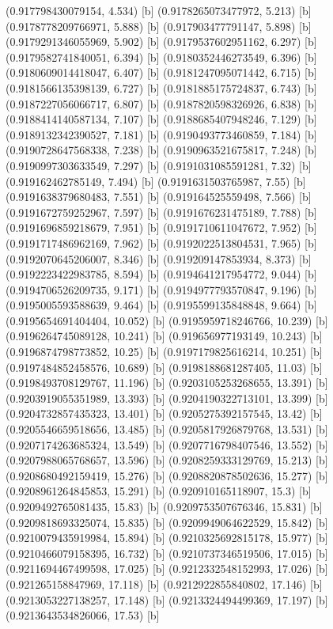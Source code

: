 {{{(0.917798430079154, 4.534) [b] 
(0.9178265073477972, 5.213) [b] 
(0.9178778209766971, 5.888) [b] 
(0.917903477791147, 5.898) [b] 
(0.9179291346055969, 5.902) [b] 
(0.9179537602951162, 6.297) [b] 
(0.9179582741840051, 6.394) [b] 
(0.9180352446273549, 6.396) [b] 
(0.9180609014418047, 6.407) [b] 
(0.9181247095071442, 6.715) [b] 
(0.9181566135398139, 6.727) [b] 
(0.9181885175724837, 6.743) [b] 
(0.9187227056066717, 6.807) [b] 
(0.9187820598326926, 6.838) [b] 
(0.9188414140587134, 7.107) [b] 
(0.9188685407948246, 7.129) [b] 
(0.9189132342390527, 7.181) [b] 
(0.9190493773460859, 7.184) [b] 
(0.9190728647568338, 7.238) [b] 
(0.9190963521675817, 7.248) [b] 
(0.9190997303633549, 7.297) [b] 
(0.9191031085591281, 7.32) [b] 
(0.919162462785149, 7.494) [b] 
(0.9191631503765987, 7.55) [b] 
(0.9191638379680483, 7.551) [b] 
(0.919164525559498, 7.566) [b] 
(0.9191672759252967, 7.597) [b] 
(0.9191676231475189, 7.788) [b] 
(0.9191696859218679, 7.951) [b] 
(0.9191710611047672, 7.952) [b] 
(0.9191717486962169, 7.962) [b] 
(0.9192022513804531, 7.965) [b] 
(0.9192070645206007, 8.346) [b] 
(0.919209147853934, 8.373) [b] 
(0.9192223422983785, 8.594) [b] 
(0.9194641217954772, 9.044) [b] 
(0.9194706526209735, 9.171) [b] 
(0.9194977793570847, 9.196) [b] 
(0.9195005593588639, 9.464) [b] 
(0.9195599135848848, 9.664) [b] 
(0.9195654691404404, 10.052) [b] 
(0.9195959718246766, 10.239) [b] 
(0.9196264745089128, 10.241) [b] 
(0.919656977193149, 10.243) [b] 
(0.9196874798773852, 10.25) [b] 
(0.9197179825616214, 10.251) [b] 
(0.9197484852458576, 10.689) [b] 
(0.9198188681287405, 11.03) [b] 
(0.9198493708129767, 11.196) [b] 
(0.9203105253268655, 13.391) [b] 
(0.9203919055351989, 13.393) [b] 
(0.9204190322713101, 13.399) [b] 
(0.9204732857435323, 13.401) [b] 
(0.9205275392157545, 13.42) [b] 
(0.9205546659518656, 13.485) [b] 
(0.9205817926879768, 13.531) [b] 
(0.9207174263685324, 13.549) [b] 
(0.9207716798407546, 13.552) [b] 
(0.9207988065768657, 13.596) [b] 
(0.9208259333129769, 15.213) [b] 
(0.9208680492159419, 15.276) [b] 
(0.9208820878502636, 15.277) [b] 
(0.9208961264845853, 15.291) [b] 
(0.920910165118907, 15.3) [b] 
(0.9209492765081435, 15.83) [b] 
(0.9209753507676346, 15.831) [b] 
(0.9209818693325074, 15.835) [b] 
(0.9209949064622529, 15.842) [b] 
(0.9210079435919984, 15.894) [b] 
(0.9210325692815178, 15.977) [b] 
(0.9210466079158395, 16.732) [b] 
(0.9210737346519506, 17.015) [b] 
(0.9211694467499598, 17.025) [b] 
(0.9212332548152993, 17.026) [b] 
(0.921265158847969, 17.118) [b] 
(0.9212922855840802, 17.146) [b] 
(0.9213053227138257, 17.148) [b] 
(0.9213324494499369, 17.197) [b] 
(0.9213643534826066, 17.53) [b] 
}}}
